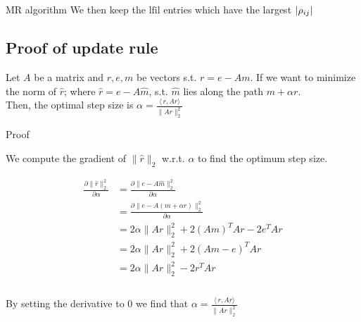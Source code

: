 \documentclass[paper=A4, fontsize=11pt]{scrartcl}
\let\originalleft\left
\let\originalright\right
\renewcommand{\left}{\mathopen{}\mathclose\bgroup\originalleft}
\renewcommand{\right}{\aftergroup\egroup\originalright}
\theoremstyle{remark}
\begin{document}
\begin{section}{MR algorithm}
	We then keep the $\text{lfil}$ entries which have the largest $\left|\rho_{i j}\right|$
	
	\subsection{Proof of update rule}
	
	Let $A$ be a matrix and $r, e, m$ be vectors s.t. $r = e - Am$. If we want to minimize the norm of $\hat{r}$; where $\hat{r} = e - A\hat{m}$, s.t. $\hat{m}$ lies along the path $m + \alpha r$. \\
	Then, the optimal step size is $\alpha = \frac{\langle\,r,Ar\rangle}{\|Ar\|_{2}^{2}}$

	Proof 

	We compute the gradient of $\|\hat{r}\|_{2}$ w.r.t. $\alpha$ to find the optimum step size. 
	
	
	
	
	\begin{equation}
	\begin{aligned}
	\frac{\partial \|\hat{r} \|_{2}^{2}}{\partial \alpha} 
	& = \frac{\partial \|e - A\hat{m}\|_{2}^{2}}{\partial \alpha} \\
	& = \frac{\partial \|e - A(m + \alpha r)\|_{2}^{2}}{\partial \alpha} \\
	& = 2\alpha \|Ar\|_{2}^{2}  + 2(Am)^{T}Ar - 2e^{T}Ar \\
	& = 2\alpha \|Ar\|_{2}^{2}  + 2(Am - e)^{T}Ar \\
	& = 2\alpha \|Ar\|_{2}^{2}  - 2r^{T}Ar \\
	\\
	\end{aligned}
	\end{equation}
	
	By setting the derivative to $0$ we find that $\alpha = \frac{\langle\,r,Ar\rangle}{\|Ar\|_{2}^{2}}$
	
	
\end{section}


\newpage
\end{document}
